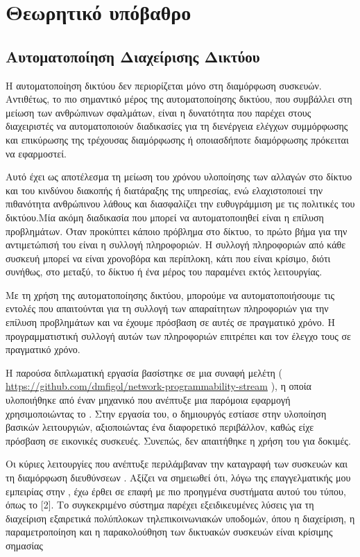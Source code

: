 \chapter{Θεωρητικό υπόβαθρο}

\section{Αυτοματοποίηση Διαχείρισης Δικτύου}



Η αυτοματοποίηση δικτύου δεν περιορίζεται μόνο στη διαμόρφωση συσκευών. 
Αντιθέτως, το πιο σημαντικό μέρος της αυτοματοποίησης δικτύου, που συμβάλλει στη μείωση των ανθρώπινων σφαλμάτων, 
είναι η δυνατότητα που παρέχει στους διαχειριστές να αυτοματοποιούν διαδικασίες για τη διενέργεια ελέγχων συμμόρφωσης και 
επικύρωσης της τρέχουσας διαμόρφωσης ή οποιασδήποτε διαμόρφωσης πρόκειται να εφαρμοστεί.

Αυτό έχει ως αποτέλεσμα τη μείωση του χρόνου υλοποίησης των αλλαγών στο δίκτυο και του κινδύνου διακοπής ή διατάραξης της υπηρεσίας, 
ενώ ελαχιστοποιεί την πιθανότητα ανθρώπινου λάθους και διασφαλίζει την ευθυγράμμιση με τις πολιτικές του δικτύου.Μία ακόμη διαδικασία που μπορεί να 
αυτοματοποιηθεί είναι η επίλυση προβλημάτων. Όταν προκύπτει κάποιο πρόβλημα στο δίκτυο, το πρώτο βήμα για την αντιμετώπισή του είναι η συλλογή πληροφοριών. 
Η συλλογή πληροφοριών από κάθε συσκευή μπορεί να είναι χρονοβόρα και περίπλοκη, κάτι που είναι κρίσιμο, διότι συνήθως, στο μεταξύ, το δίκτυο ή ένα μέρος του παραμένει 
εκτός λειτουργίας.

Με τη χρήση της αυτοματοποίησης δικτύου, μπορούμε να αυτοματοποιήσουμε τις εντολές που απαιτούνται για τη 
συλλογή των απαραίτητων πληροφοριών για την επίλυση προβλημάτων και να έχουμε πρόσβαση σε αυτές σε πραγματικό χρόνο.
Η προγραμματιστική συλλογή αυτών των πληροφοριών επιτρέπει και τον έλεγχο τους σε πραγματικό χρόνο. 

Η παρούσα διπλωματική εργασία βασίστηκε σε μια συναφή μελέτη ( \url{https://github.com/dmfigol/network-programmability-stream} ), η οποία υλοποιήθηκε από έναν μηχανικό που ανέπτυξε μια παρόμοια εφαρμογή χρησιμοποιώντας το . Στην εργασία του, ο δημιουργός εστίασε στην υλοποίηση βασικών λειτουργιών, αξιοποιώντας ένα διαφορετικό περιβάλλον, καθώς είχε πρόσβαση σε εικονικές συσκευές. Συνεπώς, δεν απαιτήθηκε η χρήση του  για δοκιμές.

Οι κύριες λειτουργίες που ανέπτυξε περιλάμβαναν την καταγραφή των συσκευών και τη διαμόρφωση διευθύνσεων . Αξίζει να σημειωθεί ότι, λόγω της επαγγελματικής μου εμπειρίας στην , έχω έρθει σε επαφή με πιο προηγμένα συστήματα αυτού του τύπου, όπως το [2]. Το συγκεκριμένο σύστημα παρέχει εξειδικευμένες λύσεις για τη διαχείριση εξαιρετικά πολύπλοκων τηλεπικοινωνιακών υποδομών, όπου η διαχείριση, η παραμετροποίηση και η παρακολούθηση των δικτυακών συσκευών είναι κρίσιμης σημασίας

